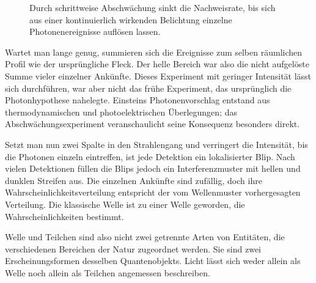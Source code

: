 \begin{figure}[h]\centering
{}\caption{Durch schrittweise Abschwächung sinkt die Nachweisrate, bis sich aus einer kontinuierlich wirkenden Belichtung einzelne Photonenereignisse auflösen lassen.}\end{figure}

Wartet man lange genug, summieren sich die Ereignisse zum selben räumlichen Profil wie der ursprüngliche Fleck. Der helle Bereich war also die nicht aufgelöste Summe vieler einzelner Ankünfte. Dieses Experiment mit geringer Intensität lässt sich durchführen, war aber nicht das frühe Experiment, das ursprünglich die Photonhypothese nahelegte. Einsteins Photonenvorschlag entstand aus thermodynamischen und photoelektrischen Überlegungen; das Abschwächungsexperiment veranschaulicht seine Konsequenz besonders direkt.

Setzt man nun zwei Spalte in den Strahlengang und verringert die Intensität, bis die Photonen einzeln eintreffen, ist jede Detektion ein lokalisierter Blip. Nach vielen Detektionen füllen die Blips jedoch ein Interferenzmuster mit hellen und dunklen Streifen aus. Die einzelnen Ankünfte sind zufällig, doch ihre Wahrscheinlichkeitsverteilung entspricht der vom Wellenmuster vorhergesagten Verteilung. Die klassische Welle ist zu einer Welle geworden, die Wahrscheinlichkeiten bestimmt.

Welle und Teilchen sind also nicht zwei getrennte Arten von Entitäten, die verschiedenen Bereichen der Natur zugeordnet werden. Sie sind zwei Erscheinungsformen desselben Quantenobjekts. Licht lässt sich weder allein als Welle noch allein als Teilchen angemessen beschreiben.

